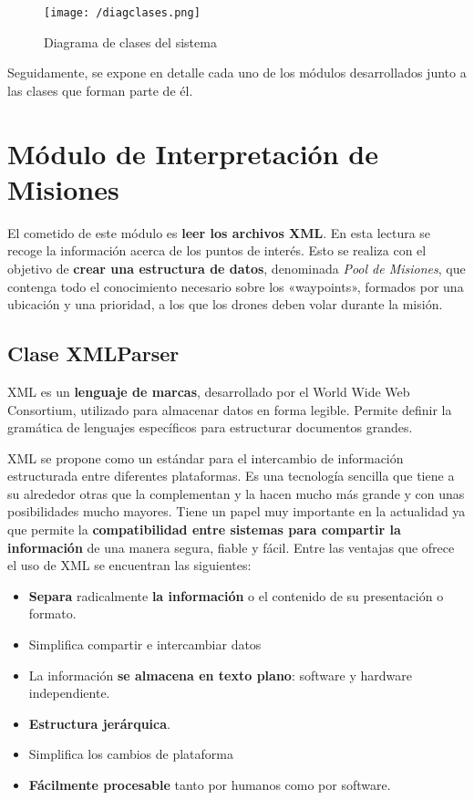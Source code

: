 \begin{figure}[!h]
\begin{center}
\texttt{[image: /diagclases.png]}
\caption[Diagrama de clases del sistema]{Diagrama de clases del sistema}
\label{fig:diagclases}
\end{center}
\end{figure}

Seguidamente, se expone en detalle cada uno de los módulos desarrollados junto a las clases que forman parte de él.

\section{Módulo de Interpretación de Misiones}

El cometido de este módulo es \textbf{leer los archivos XML}. En esta lectura se recoge la información acerca de los puntos de interés. Esto se realiza con el objetivo de \textbf{crear una estructura de datos}, denominada \textit{Pool de Misiones}, que contenga todo el conocimiento necesario sobre los «waypoints», formados por una ubicación y una prioridad, a los que los drones deben volar durante la misión.


\subsection{Clase XMLParser}

XML es un \textbf{lenguaje de marcas}, desarrollado por el World Wide Web Consortium, utilizado para almacenar datos en forma legible. Permite definir la gramática de lenguajes específicos para estructurar documentos grandes. 

XML se propone como un estándar para el intercambio de información estructurada entre diferentes plataformas. Es una tecnología sencilla que tiene a su alrededor otras que la complementan y la hacen mucho más grande y con unas posibilidades mucho mayores. Tiene un papel muy importante en la actualidad ya que permite la \textbf{compatibilidad entre sistemas para compartir la información} de una manera segura, fiable y fácil. Entre las ventajas que ofrece el uso de XML se encuentran las siguientes:

\begin{itemize}
\item \textbf{Separa} radicalmente \textbf{la información} o el contenido de su presentación o formato.
\item Simplifica compartir e intercambiar datos
\item La información \textbf{se almacena en texto plano}: software y hardware independiente.
\item \textbf{Estructura jerárquica}.
\item Simplifica los cambios de plataforma
\item \textbf{Fácilmente procesable} tanto por humanos como por software.
\end{itemize}

